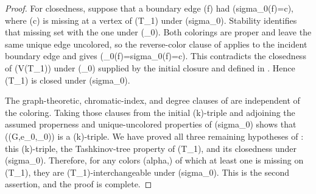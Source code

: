 \begin{proof}
For closedness, suppose that a boundary edge (f) had
(sigma_0(f)=c), where (c) is missing at a vertex of (T_1) under
(sigma_0).  Stability identifies that missing set with the one under
(\varphi_0).  Both colorings are proper and leave the same unique edge
uncolored, so the reverse-color clause of  applies to the
incident boundary edge and gives
(\varphi_0(f)=sigma_0(f)=c).  This contradicts the closedness of
(V(T_1)) under (\varphi_0) supplied by the initial closure and defined
in .  Hence (T_1) is closed under
(sigma_0).

The graph-theoretic, chromatic-index, and degree clauses of
 are independent of the coloring.  Taking those clauses
from the initial (k)-triple and adjoining the assumed properness and
unique-uncolored properties of (sigma_0) shows that
((G,e_0,\sigma_0)) is a (k)-triple.  We have proved all three remaining
hypotheses of : this (k)-triple, the Tashkinov-tree
property of (T_1), and its closedness under (sigma_0).  Therefore, for
any colors (alpha,\beta) of which at least one is missing on (T_1),
they are (T_1)-interchangeable under (sigma_0).  This is the second
assertion, and the proof is complete.
\end{proof}
